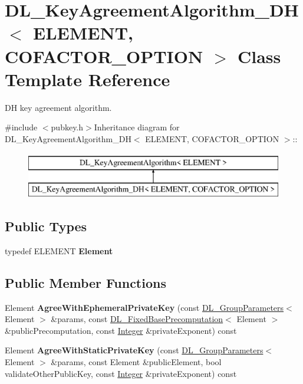\hypertarget{class_d_l___key_agreement_algorithm___d_h}{
\section{DL\_\-KeyAgreementAlgorithm\_\-DH$<$ ELEMENT, COFACTOR\_\-OPTION $>$ Class Template Reference}
\label{class_d_l___key_agreement_algorithm___d_h}
}


DH key agreement algorithm.  


{\ttfamily \#include $<$pubkey.h$>$}Inheritance diagram for DL\_\-KeyAgreementAlgorithm\_\-DH$<$ ELEMENT, COFACTOR\_\-OPTION $>$::\begin{figure}[H]
\begin{center}
\leavevmode
\includegraphics[height=2cm]{class_d_l___key_agreement_algorithm___d_h}
\end{center}
\end{figure}
\subsection*{Public Types}
\begin{DoxyCompactItemize}
\item 
\hypertarget{class_d_l___key_agreement_algorithm___d_h_a7826da86d51bf2074368604372f101f8}{
typedef ELEMENT {\bfseries Element}}
\label{class_d_l___key_agreement_algorithm___d_h_a7826da86d51bf2074368604372f101f8}

\end{DoxyCompactItemize}
\subsection*{Public Member Functions}
\begin{DoxyCompactItemize}
\item 
\hypertarget{class_d_l___key_agreement_algorithm___d_h_a55279caeebb64b68b5925a77abcb336b}{
Element {\bfseries AgreeWithEphemeralPrivateKey} (const \hyperlink{class_d_l___group_parameters}{DL\_\-GroupParameters}$<$ Element $>$ \&params, const \hyperlink{class_d_l___fixed_base_precomputation}{DL\_\-FixedBasePrecomputation}$<$ Element $>$ \&publicPrecomputation, const \hyperlink{class_integer}{Integer} \&privateExponent) const }
\label{class_d_l___key_agreement_algorithm___d_h_a55279caeebb64b68b5925a77abcb336b}

\item 
\hypertarget{class_d_l___key_agreement_algorithm___d_h_a10e3e05ac2cf6158270f4a45abdd0517}{
Element {\bfseries AgreeWithStaticPrivateKey} (const \hyperlink{class_d_l___group_parameters}{DL\_\-GroupParameters}$<$ Element $>$ \&params, const Element \&publicElement, bool validateOtherPublicKey, const \hyperlink{class_integer}{Integer} \&privateExponent) const }
\label{class_d_l___key_agreement_algorithm___d_h_a10e3e05ac2cf6158270f4a45abdd0517}

\end{DoxyCompactItemize}
